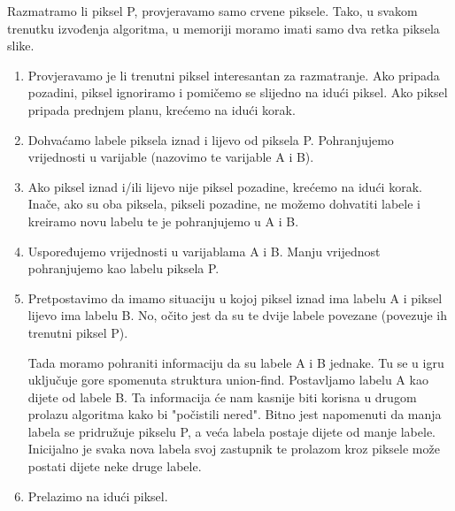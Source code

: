 \documentclass[times, utf8, diplomski]{fer}
\theoremstyle{definition}
\begin{document}
\begin{center}
\end{center}
Razmatramo li piksel P, provjeravamo samo crvene piksele. Tako, u svakom trenutku izvođenja algoritma, u memoriji moramo imati samo dva retka piksela slike.
\begin{enumerate}
\item Provjeravamo je li trenutni piksel interesantan za razmatranje. Ako pripada pozadini, piksel ignoriramo i pomičemo se slijedno na idući piksel. Ako piksel pripada prednjem planu, krećemo na idući korak.
\item Dohvaćamo labele piksela iznad i lijevo od piksela P. Pohranjujemo vrijednosti u varijable (nazovimo te varijable A i B).
\item Ako piksel iznad i/ili lijevo nije piksel pozadine, krećemo na idući korak. Inače, ako su oba piksela, pikseli pozadine, ne možemo dohvatiti labele i kreiramo novu labelu te je pohranjujemo u A i B.
\item Uspoređujemo vrijednosti u varijablama A i B. Manju vrijednost pohranjujemo kao labelu piksela P.
\item Pretpostavimo da imamo situaciju u kojoj piksel iznad ima labelu A i piksel lijevo ima labelu B. No, očito jest da su te dvije labele povezane (povezuje ih trenutni piksel P).
\begin{center}
\end{center}
Tada moramo pohraniti informaciju da su labele A i B jednake. Tu se u igru uključuje gore spomenuta struktura union-find. Postavljamo labelu A kao dijete od labele B. Ta informacija će nam kasnije biti korisna u drugom prolazu algoritma kako bi "počistili nered". Bitno jest napomenuti da manja labela se pridružuje pikselu P, a veća labela postaje dijete od manje labele. Inicijalno je svaka nova labela svoj zastupnik te prolazom kroz piksele može postati dijete neke druge labele.
\item Prelazimo na idući piksel.
\end{enumerate}
\end{document}
